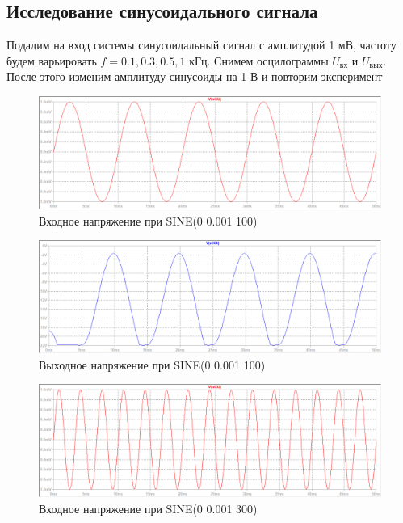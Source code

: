 \documentclass[a4paper, 12pt]{article}
\begin{document}
    \subsection{Исследование синусоидального сигнала}
    Подадим на вход системы синусоидальный сигнал с амплитудой 1 мВ,
    частоту будем варьировать $f=0.1,0.3,0.5,1$ кГц. Снимем осцилограммы
    $U_\text{вх}$ и $U_\text{вых}$. После этого изменим амплитуду синусоиды на 1 В и повторим эксперимент
    \begin{figure}[H]
        \centering
        \includegraphics[scale=0.46]{3task_sine_in_1mV_100f.png}
        \captionsetup{skip=0pt}
        \caption{Входное напряжение при SINE(0 0.001 100)}
        \label{fig:3task_sine_in_1mV_100f}
    \end{figure}
    \begin{figure}[H]
        \centering
        \includegraphics[scale=0.46]{3task_sine_out_1mV_100f.png}
        \captionsetup{skip=0pt}
        \caption{Выходное напряжение при SINE(0 0.001 100)}
        \label{fig:3task_sine_in_1mV_100f}
    \end{figure}
    \begin{figure}[H]
        \centering
        \includegraphics[scale=0.46]{3task_sine_in_1mV_300f.png}
        \captionsetup{skip=0pt}
        \caption{Входное напряжение при SINE(0 0.001 300)}
        \label{fig:3task_sine_in_1mV_300f}
    \end{figure}
\end{document}
